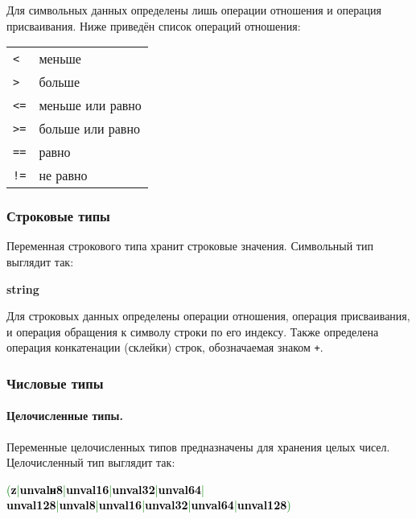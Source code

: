 \documentclass[10pt]{report}
\begin{document}
Для символьных данных определены лишь операции отношения и операция присваивания. Ниже приведён список операций отношения:

\begin{tabular}{ll}
 \texttt{<}         & меньше                                        \\
 \texttt{>}         & больше                                        \\
 \texttt{<=}        & меньше или равно                              \\
 \texttt{>=}        & больше или равно                              \\
 \texttt{==}        & равно                                         \\
 \texttt{!=}        & не равно                                      \\
\end{tabular}

        \subsubsection{Строковые типы}
Переменная строкового типа хранит строковые значения. Символьный тип выглядит так:
\begin{center}
\noindent\textbf{string}
\end{center}

Для строковых данных определены операции отношения, операция присваивания, и операция обращения к символу строки по его индексу. Также определена операция конкатенации (склейки) строк, обозначаемая знаком \glqq\texttt{+}\grqq.

        \subsubsection{Числовые типы}
            \paragraph{Целочисленные типы.}Переменные целочисленных типов предназначены для хранения целых чисел. Целочисленный тип выглядит так:
\begin{center}
\noindent\textcolor{Green}{(\textcolor{Black}{\textbf{z}}|\textcolor{Black}{\textbf{unvalн8}}|\textcolor{Black}{\textbf{unval16}}|\textcolor{Black}{\textbf{unval32}}|\textcolor{Black}{\textbf{unval64}}|\\
\textcolor{Black}{\textbf{unval128}}|\textcolor{Black}{\textbf{unval8}}|\textcolor{Black}{\textbf{unval16}}|\textcolor{Black}{\textbf{unval32}}|\textcolor{Black}{\textbf{unval64}}|\textcolor{Black}{\textbf{unval128}})}
\end{center}
\end{document}
